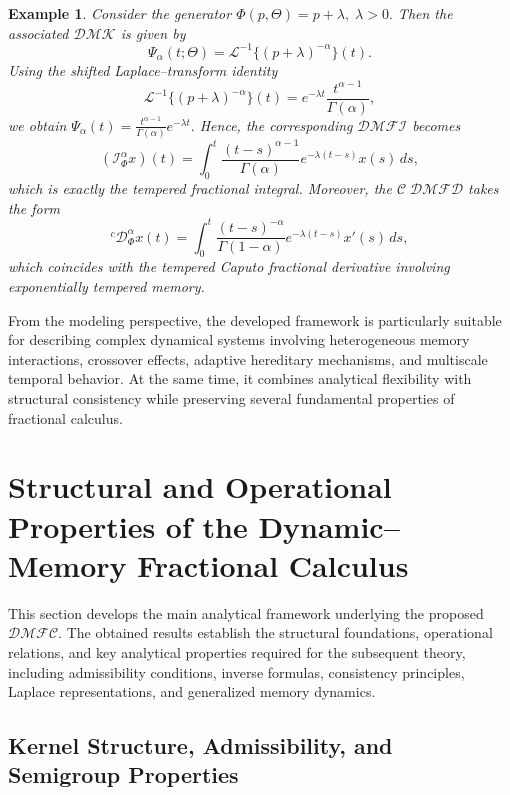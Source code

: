 \documentclass[11pt]{article}
\numberwithin{equation}{section}
\newtheorem{example}[definition]{Example}
\begin{document}
\begin{example}
Consider the generator
\(
\Phi(p,\Theta)=p+\lambda,
\; \lambda>0.
\)
Then the associated $\mathcal{DMK}$ is given by
\[
\Psi_\alpha(t;\Theta)
=
\mathcal L^{-1}
\{(p+\lambda)^{-\alpha}\}(t).
\]
Using the shifted Laplace--transform identity
\[
\mathcal L^{-1}
\{(p+\lambda)^{-\alpha}\}(t)
=
e^{-\lambda t}
\frac{t^{\alpha-1}}{\Gamma(\alpha)},
\]
we obtain
\(
\Psi_\alpha(t)
=
\frac{t^{\alpha-1}}{\Gamma(\alpha)}
e^{-\lambda t}.
\)
Hence, the corresponding $\mathcal{DMFI}$  becomes
\[
(\mathcal I_\Phi^\alpha x)(t)
=
\int_0^t
\frac{(t-s)^{\alpha-1}}{\Gamma(\alpha)}
e^{-\lambda(t-s)}
x(s)\,ds,
\]
which is exactly the tempered fractional integral.
Moreover, the $\mathcal{C\;DMFD}$  takes the form
\[
{}^c\mathcal D_\Phi^\alpha x(t)
=
\int_0^t
\frac{(t-s)^{-\alpha}}{\Gamma(1-\alpha)}
e^{-\lambda(t-s)}
x'(s)\,ds,
\]
which coincides with the tempered Caputo fractional derivative involving exponentially tempered memory.

\end{example}


From the modeling perspective, the developed framework is particularly
suitable for describing complex dynamical systems involving heterogeneous
memory interactions, crossover effects, adaptive hereditary mechanisms,
and multiscale temporal behavior. At the same time, it combines
analytical flexibility with structural consistency while preserving
several fundamental properties of fractional calculus.



\section{Structural and Operational Properties of the Dynamic--Memory Fractional Calculus}


This section develops the main analytical framework underlying the proposed $\mathcal{DMFC}$. The obtained results establish the structural foundations, operational relations, and key analytical properties required for the subsequent theory, including admissibility conditions, inverse formulas, consistency principles, Laplace representations, and generalized memory dynamics.

\subsection{Kernel Structure, Admissibility, and Semigroup Properties}
\end{document}
